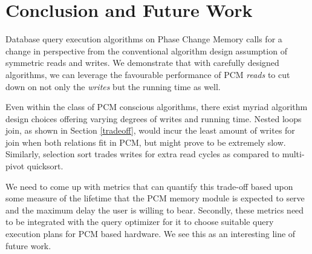 \section{Conclusion and Future Work}
\label{conclusion}
Database query execution algorithms on Phase Change Memory calls for a change in perspective from the conventional algorithm design assumption of symmetric reads and writes. We demonstrate that with carefully designed algorithms, we can leverage the favourable performance of PCM \textit{reads} to cut down on not only the \textit{writes} but the running time as well. 

Even within the class of PCM conscious algorithms, there exist myriad algorithm design choices offering varying degrees of writes and running time. Nested loops join, as shown in Section \ref{tradeoff}, would incur the least amount of writes for join when both relations fit in PCM, but might prove to be extremely slow. Similarly, selection sort trades writes for extra read cycles as compared to multi-pivot quicksort. 

We need to come up with metrics that can quantify this trade-off based upon some measure of the lifetime that the PCM memory module is expected to serve and the maximum delay the user is willing to bear. Secondly, these metrics need to be integrated with the query optimizer for it to choose suitable query execution plans for PCM based hardware. We see this as an interesting line of future work.
